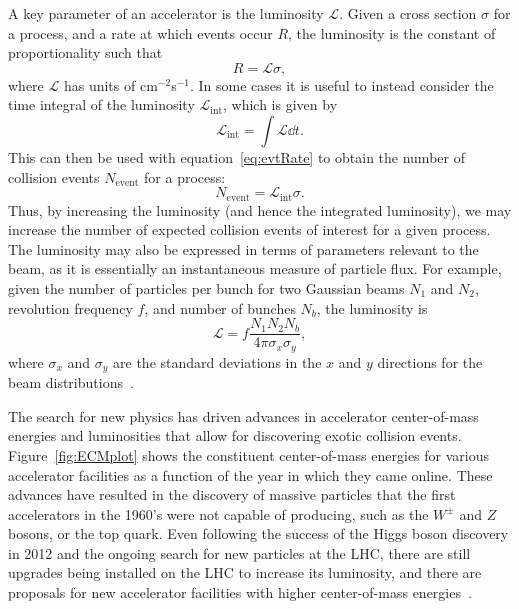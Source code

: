 A key parameter of an accelerator is the luminosity $\mathcal{L}$.
Given a cross section $\sigma$ for a process, and a rate at which events occur $R$, the luminosity is the constant of proportionality such that
\begin{equation}\label{eq:evtRate}
  R=\mathcal{L}\sigma,
\end{equation}
where $\mathcal{L}$ has units of cm$^{-2}$s$^{-1}$.
In some cases it is useful to instead consider the time integral of the luminosity $\mathcal{L}_\mathrm{int}$, which is given by
\begin{equation}
  \mathcal{L}_\mathrm{int}=\int\mathcal{L}\dd{t}.
\end{equation}
This can then be used with equation~\ref{eq:evtRate} to obtain the number of collision events $N_\mathrm{event}$ for a process:
\begin{equation}
  N_\mathrm{event}=\mathcal{L}_\mathrm{int}\sigma.
\end{equation}
Thus, by increasing the luminosity (and hence the integrated luminosity), we may increase the number of expected collision events of interest for a given process.
The luminosity may also be expressed in terms of parameters relevant to the beam, as it is essentially an instantaneous measure of particle flux.
For example, given the number of particles per bunch for two Gaussian beams $N_1$ and $N_2$, revolution frequency $f$, and number of bunches $N_b$, the luminosity is
\begin{equation}
  \mathcal{L}=f\frac{N_1N_2N_b}{4\pi\sigma_x\sigma_y},
\end{equation}
where $\sigma_x$ and $\sigma_y$ are the standard deviations in the $x$ and $y$ directions for the beam distributions~\cite{Herr:941318}.

The search for new physics has driven advances in accelerator center-of-mass energies and luminosities that allow for discovering exotic collision events.
Figure~\ref{fig:ECMplot} shows the constituent center-of-mass energies for various accelerator facilities as a function of the year in which they came online.
These advances have resulted in the discovery of massive particles that the first accelerators in the 1960's were not capable of producing, such as the $W^\pm$ and $Z$ bosons, or the top quark.
Even following the success of the Higgs boson discovery in 2012 and the ongoing search for new particles at the LHC, there are still upgrades being installed on the LHC to increase its luminosity, and there are proposals for new accelerator facilities with higher center-of-mass energies~\cite{Bicer_2014}.

